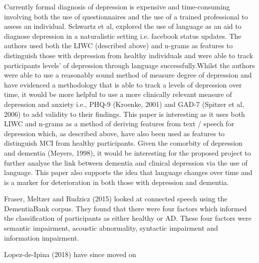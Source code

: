 \documentclass[a4paper]{article}
\begin{document}
\par
Currently formal diagnosis of depression is expensive and time-consuming involving both the use of questionnaires and the use of a trained professional to assess an individual. Schwartz et al, explored the use of language as an aid to diagnose depression in a naturalistic setting i.e. facebook status updates. The authors used both the LIWC (described above) and n-grams as features to distinguish those with depression from healthy individuals and were able to track participants levels' of depression through language successfully.Whilst the authors were able to use a reasonably sound method of measure degree of depression and have evidenced a methodology that is able to track a levels of depression over time, it would be more helpful to use a more clinically relevant measure of depression and anxiety i.e., PHQ-9 (Kroenke, 2001) and GAD-7 (Spitzer et al, 2006) to add validity to their findings. This paper is interesting as it uses both LIWC and n-grams as a method of deriving features from text / speech for depression which, as described above, have also been used as features to distinguish MCI from healthy participants. Given the comorbity of depression and dementia (Meyers, 1998), it would be interesting for the proposed project to further analyse the link between dementia and clinical depression via the use of language. This paper also supports the idea that language changes over time and is a marker for deterioration in both those with depression and dementia. \newline
\par
Fraser, Meltzer and Rudzicz (2015) looked at connected speech using the DementiaBank corpus. They found that there were four factors which informed the classification of participants as either healthy or AD. These four factors were semantic impairment, acoustic abnormality, syntactic impairment and information impairment.\newline
\par
Lopez-de-Ipina (2018) have since moved on 
\end{document}
